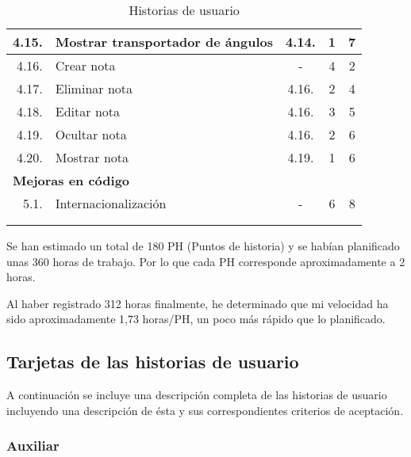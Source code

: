 \begin{longtable} {r l c c c}
	\hline
	4.15.	&	Mostrar transportador de ángulos	&	4.14.			&	1				&	7	\\
	\hline
	4.16.	&	Crear nota							&	-				&	4				&	2	\\
	\hline
	4.17.	&	Eliminar nota						&	4.16.			&	2				&	4	\\
	\hline
	4.18.	&	Editar nota							&	4.16.			&	3				&	5	\\
	\hline
	4.19.	&	Ocultar nota						&	4.16.			&	2				&	6	\\
	\hline
	4.20.	&	Mostrar nota						&	4.19.			&	1				&	6	\\
	\hline
	\multicolumn{5}{l}{\textbf{Mejoras en código}} \\
	\hline
	5.1.	&	Internacionalización				&	-				&	6				&	8	\\
	\hline
	\\
	\caption{Historias de usuario}
	\label{tab:analisis/hus}
\end{longtable}

Se han estimado un total de 180 PH (Puntos de historia) y se habían planificado unas 360 horas de trabajo. Por lo que cada PH corresponde aproximadamente a 2 horas.

Al haber registrado 312 horas finalmente, he determinado que mi velocidad ha sido aproximadamente 1,73 horas/PH, un poco más rápido que lo planificado.

\subsection{Tarjetas de las historias de usuario}

A continuación se incluye una descripción completa de las historias de usuario incluyendo una descripción de ésta y sus correspondientes criterios de aceptación.

\subsubsection{Auxiliar}

